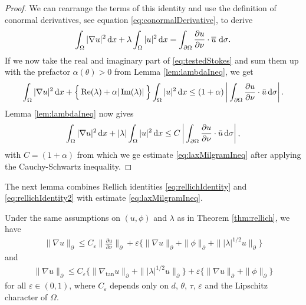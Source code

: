 \begin{proof}
  We can rearrange the terms of this identity and use the definition of conormal derivatives, see equation \eqref{eq:conormalDerivative}, to derive
  \begin{align}
    \label{eq:testedStokes}
    \int_\Omega |\nabla u|^2 \, {\operatorname{d}\!{x}} + \lambda \int_\Omega |u|^2 \, {\operatorname{d}\!{x}} = \int_{\partial\Omega} \frac{\partial u}{\partial \nu} \cdot \overline u \, \, {\operatorname{d}\!{\sigma}}.
  \end{align}
  If we now take the real and imaginary part of \eqref{eq:testedStokes} and sum them up with the prefactor $\alpha(\theta) > 0$ from Lemma \ref{lem:lambdaIneq}, we get
  \begin{align*}
    \int_\Omega |\nabla u|^2 \, {\operatorname{d}\!{x}} + \Big\{ \operatorname{Re}(\lambda) + \alpha |\operatorname{Im}(\lambda)|\, \Big\} \int_\Omega |u|^2 \, {\operatorname{d}\!{x}}
    \leq (1 + \alpha) \, \bigg| \int_{\partial\Omega} \frac{\partial u}{\partial \nu} \cdot \bar u \, {\operatorname{d}\!{\sigma}} \bigg|\,.
  \end{align*}
  Lemma \ref{lem:lambdaIneq} now gives
  \begin{align*}
    \int_\Omega |\nabla u|^2 \, {\operatorname{d}\!{x}} + |\lambda| \int_\Omega |u|^2 \, {\operatorname{d}\!{x}} \leq C\,  \bigg| \int_{\partial\Omega} \frac{\partial u}{\partial \nu} \cdot \bar u \, {\operatorname{d}\!{\sigma}} \bigg|\,,
  \end{align*}
  with $C = (1 + \alpha)$ from which we ge estimate \eqref{eq:laxMilgramIneq} after applying the Cauchy-Schwartz inequality.
\end{proof}

The next lemma combines Rellich identities \eqref{eq:rellichIdentity} and \eqref{eq:rellichIdentity2} with estimate \eqref{eq:laxMilgramIneq}.

\begin{lem}
  Under the same assumptions on $(u,\phi)$ and $\lambda$ as in Theorem \ref{thm:rellich}, we have
  \begin{align}
    \label{eq:gradEstimateRellich}
    \| \nabla u\|_\partial \leq C_\varepsilon \| \frac{\partial u}{\partial \nu} \|_\partial + \varepsilon \Big\{ \|\nabla u\|_\partial + \|\phi\|_\partial + \| |\lambda|^{1/2} u\|_\partial \Big\}
  \end{align}
  and
  \begin{align}
    \label{eq:gradEstimateRellich2}
    \|\nabla u\|_\partial \leq C_\varepsilon \Big\{ \|\nabla_{\mathrm{tan}} u \|_\partial + \||\lambda|^{1/2} u\|_\partial \Big\} + \varepsilon \{ \|\nabla u\|_\partial + \|\phi\|_\partial \}
  \end{align}
  for all $\varepsilon \in (0,1)$, where $C_\varepsilon$ depends only on $d$, $\theta$, $\tau$, $\varepsilon$ and the Lipschitz character of $\Omega$.
\end{lem}


